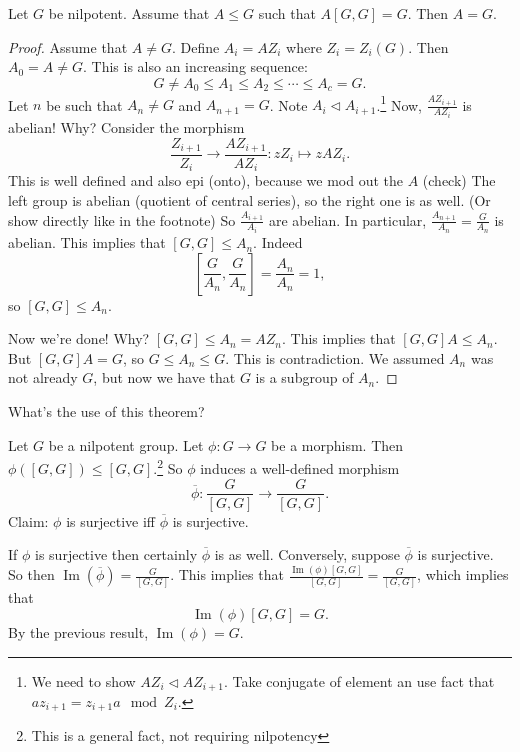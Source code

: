 \begin{theorem}[16.2.5]
    Let $G$ be nilpotent.
    Assume that $A \le G$ such that $A [G, G] = G$.
    Then $A = G$.
\end{theorem}
\begin{proof}
    Assume that $A \neq G$.
    Define $A_i = A Z_i$ where  $Z_i = Z_i(G)$.
    Then $A_0 = A \neq G$.
    This is also an increasing sequence:
    \[
    G \neq A_0 \le  A_1 \le  A_2 \le  \cdots \le  A_c = G
    .\] 
    Let $n$ be such that $A_n \neq G$ and $A_{n+1} = G$.
    Note $A_i \triangleleft A_{i+1}$.\footnote {
    We need to show $A Z_i \triangleleft A Z_{i+1}$.
    Take conjugate of element an use fact that $a z_{i+1} = z_{i+1} a \mod Z_i$.
}
    Now, $\frac{A Z_{i+1}}{A Z_i}$ is abelian!
    Why? Consider the morphism 
    \[
    \frac{Z_{i+1}}{Z_i} \to  \frac{A Z_{i+1}}{A Z_i}: z Z_i \mapsto  z A Z_i
    .\] 
    This is well defined and also epi (onto), because we mod out the $A$ (check)
    The left group is abelian (quotient of central series), so the right one is as well. (Or show directly like in the footnote)
    So $\frac{A_{i+1}}{ A_i}$ are abelian.
    In particular, $\frac{A_{n+1}}{ A_n} = \frac{G}{A_n}$ is abelian. This implies that $[G, G] \le A_n$. Indeed
    \[
        \left[\frac{G}{A_n}, \frac{G}{A_n}\right] = \frac{A_n}{A_n} = 1
    ,\] 
    so $[G, G] \le A_n$.

    Now we're done!
    Why?
    $[G, G] \le A_n = A Z_n$.
    This implies that $[G, G] A \le  A_n$.
    But $[G, G] A= G$, so  $G \le A_n \le G$.
    This is contradiction. We assumed $A_n$ was not already $G$, but now we have that $G$ is a subgroup of  $A_n$.
\end{proof}

What's the use of this theorem?

\begin{eg}
    Let $G$ be a nilpotent group.
    Let $\phi: G \to  G$ be a morphism.
    Then $\phi([G, G]) \le [G, G]$.\footnote{This is a general fact, not requiring nilpotency}
    So $\phi$ induces a well-defined morphism
    \[
        \overline{\phi}: \frac{G}{[G, G]} \to  \frac{G}{[G, G]}
    .\] 
    Claim: $\phi$ is surjective iff $\overline{\phi}$ is surjective.
\end{eg}
\begin{explanation}
    If $\phi$ is surjective then certainly $\overline{\phi}$ is as well.
    Conversely, suppose $\overline{\phi}$ is surjective.
    So then $\operatorname{Im}(\overline{\phi}) = \frac{G}{[G, G]}$.
    This implies that $\frac{\operatorname{Im}(\phi) [G, G]}{[G, G]} = \frac{G}{[G, G]}$, which implies that
    \[
        \operatorname{Im} (\phi) [G, G] = G
    .\] 
    By the previous result, $\operatorname{Im}(\phi) = G$.
\end{explanation}

